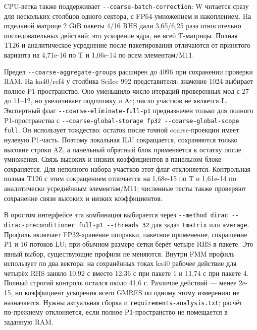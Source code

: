 \documentclass[
  russian,
  11pt,
  a4paper,
]{report}
\begin{document}
CPU-ветка также поддерживает \nolinkurl{--coarse-batch-correction}: W
читается сразу для нескольких столбцов одного сектора, с FP64-умножением
и накоплением. На отдельной матрице 2 GiB пакеты 4/16 RHS дали 3,65/6,25
раза относительно последовательных действий; это ускорение ядра, не всей
T-матрицы. Полная T126 и аналитическое усреднение после пакетирования
отличаются от принятого варианта на 4,71e-16 по T и 1,06e-14 по всем
элементам/M11.

Предел \nolinkurl{--coarse-aggregate-groups} расширен до 4096 при
сохранении проверки RAM. На ka40/ref4 у столбика SciIce 992
представителя: значение 1024 выбирает полное P1-пространство. Оно
уменьшило число итераций проверенных мод с 27 до 11--12, но увеличивает
подготовку и Ac; число участков не является L. Экспертный флаг
\nolinkurl{--coarse-eliminate-full-p1} предназначен только для полного
P1-пространства с
\nolinkurl{--coarse-global-storage fp32 --coarse-global-scope full}. Он
использует тождество: остаток после точной coarse-проекции имеет нулевую
P1-часть. Поэтому локальная ILU сокращается, сохраняются только высокие
строки AZ, а панельный обратный блок применяется к остатку после
умножения. Связь высоких и низких коэффициентов в панельном блоке
сохраняется. Для неполного набора участков этот флаг отклоняется.
Контрольная полная T126 с этим сокращением отличается на 1,68e-15 по T и
1,61e-14 по аналитически усреднённым элементам/M11; численные тесты
также проверяют сохранение связи высоких и низких коэффициентов.

В простом интерфейсе эта комбинация выбирается через
\nolinkurl{--method dirac --dirac-preconditioner full-p1 --threads 32}
для задач \nolinkurl{tmatrix} или \nolinkurl{average}. Профиль включает
FP32-хранение поправки, пакетное применение, сокращение P1 и 16 потоков
LU; при обычном размере сетки берёт четыре RHS в пакете. Это явный
выбор, существующие профили не меняются. Внутри FMM профиль использует
по два вектора: на сохранённых токах ka40 рабочее действие для четырёх
RHS заняло 10,92 с вместо 12,36 с при пакете 1 и 11,74 с при пакете 4.
Полный строгий контроль остался около 41,6 с. Различие действий ---
менее 2e-15, но коэффициент ускорения всего GMRES по одному этому
измерению не назначается. Нужны актуальная сборка и
\nolinkurl{requirements-analysis.txt}; расчёт по-прежнему отклоняется,
если полное P1-пространство не помещается в заданную RAM.
\end{document}
